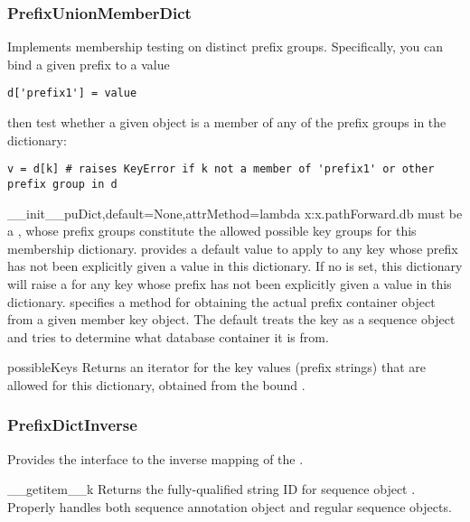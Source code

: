 \documentclass{howto}
\begin{document}
\subsubsection{PrefixUnionMemberDict}
Implements membership testing on distinct prefix groups.  Specifically,
you can bind a given prefix to a value
\begin{verbatim}
d['prefix1'] = value
\end{verbatim}
then test whether a given object  is a member of any of the
prefix groups in the dictionary:
\begin{verbatim}
v = d[k] # raises KeyError if k not a member of 'prefix1' or other prefix group in d
\end{verbatim}

\begin{funcdesc}{__init__}{puDict,default=None,attrMethod=lambda x:x.pathForward.db}
   must be a , whose prefix groups constitute the
  allowed possible key groups for this membership dictionary.  
  provides a default value to apply to any key whose prefix has not been explicitly
  given a value in this dictionary.  If no  is set, this dictionary
  will raise a  for any key whose prefix has not been 
  explicitly given a value in this dictionary.
   specifies a method for obtaining
  the actual prefix container object from a given member key object.  The default
   treats the key as a sequence object and tries to determine what
  database container it is from.
\end{funcdesc}

\begin{funcdesc}{possibleKeys}{}
  Returns an iterator for the key values (prefix strings) that are allowed for 
  this dictionary, obtained from the bound .
\end{funcdesc}

\subsubsection{PrefixDictInverse}
Provides the interface to the inverse mapping of the .
\begin{funcdesc}{__getitem__}{k}
  Returns the fully-qualified string ID for sequence object .  
  Properly handles both sequence annotation object and regular sequence
  objects.
\end{funcdesc}
\end{document}
